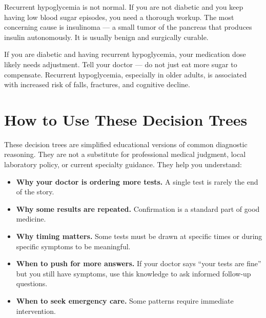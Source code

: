 Recurrent hypoglycemia is not normal. If you are not diabetic and you keep having low blood sugar episodes, you need a thorough workup. The most concerning cause is insulinoma --- a small tumor of the pancreas that produces insulin autonomously. It is usually benign and surgically curable.

If you are diabetic and having recurrent hypoglycemia, your medication dose likely needs adjustment. Tell your doctor --- do not just eat more sugar to compensate. Recurrent hypoglycemia, especially in older adults, is associated with increased risk of falls, fractures, and cognitive decline.

\clearpage
\section{How to Use These Decision Trees}

These decision trees are simplified educational versions of common diagnostic reasoning. They are not a substitute for professional medical judgment, local laboratory policy, or current specialty guidance. They help you understand:

\begin{itemize}
    \item \textbf{Why your doctor is ordering more tests.} A single test is rarely the end of the story.
    \item \textbf{Why some results are repeated.} Confirmation is a standard part of good medicine.
    \item \textbf{Why timing matters.} Some tests must be drawn at specific times or during specific symptoms to be meaningful.
    \item \textbf{When to push for more answers.} If your doctor says ``your tests are fine'' but you still have symptoms, use this knowledge to ask informed follow-up questions.
    \item \textbf{When to seek emergency care.} Some patterns require immediate intervention.
\end{itemize}
